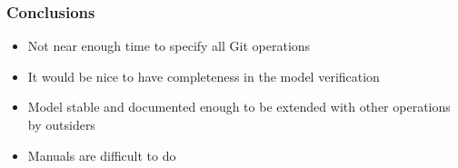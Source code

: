 \documentclass{beamer}
\begin{document}
\begin{frame}
	\frametitle{Conclusions}
	\begin{itemize}
	\item Not near enough time to specify all Git operations
	\item It would be nice to have completeness in the model verification
	\item Model stable and documented 
	enough to be extended with other operations by outsiders
	\item Manuals are difficult to do
	\end{itemize}
\end{frame}
\end{document}

